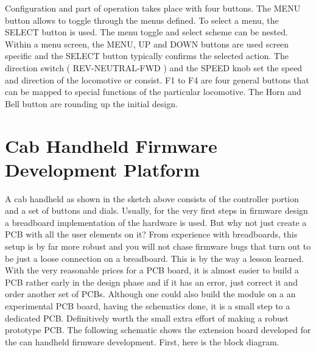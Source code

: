 
Configuration and part of operation takes place with four buttons. The MENU button allows to toggle through the menus defined. To select a menu, the SELECT button is used. The menu toggle and select scheme can be nested. Within a menu screen, the MENU, UP and DOWN buttons are used screen specific and the SELECT button typically confirms the selected action. The direction switch ( REV-NEUTRAL-FWD ) and the SPEED knob set the speed and direction of the locomotive or consist. F1 to F4 are four general buttons that can be mapped to special functions of the particular locomotive. The Horn and Bell button are rounding up the initial design.

\section{Cab Handheld Firmware Development Platform}

A cab handheld as shown in the sketch above consists of the controller portion and a set of buttons and dials. Usually, for the very first steps in firmware design a breadboard implementation of the hardware is used. But why not just create a PCB with all the user elements on it? From experience with breadboards, this setup is by far more robust and you will not chase firmware bugs that turn out to be just a loose connection on a breadboard. This is by the way a lesson learned. With the very reasonable prices for a PCB board, it is almost easier to build a PCB rather early in the design phase and if it has an error, just correct it and order another set of PCBs. Although one could also build the module on a an experimental PCB board, having the schematics done, it is a small step to a dedicated PCB. Definitively worth the small extra effort of making a robust prototype PCB. The following schematic shows the extension board developed for the can handheld firmware development. First, here is the block diagram.

